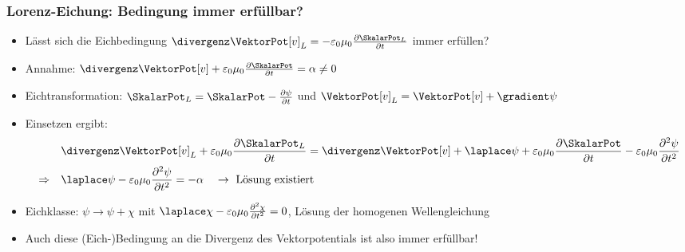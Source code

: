 \begin{frame}
  \frametitle{Lorenz-Eichung: Bedingung immer erfüllbar?}
  \begin{itemize}[<+->]
  \item Lässt sich die \alert{Eichbedingung} $\divergenz\VektorPot[v]_L = -\varepsilon_0\mu_0\frac{\partial\SkalarPot_L}{\partial t}$ immer erfüllen?
  \item Annahme: $\divergenz\VektorPot[v] + \varepsilon_0\mu_0\frac{\partial\SkalarPot}{\partial t} = \alpha \neq 0$
  \item Eichtransformation: $\SkalarPot_L = \SkalarPot - \frac{\partial \psi}{\partial t}$ und $\VektorPot[v]_L = \VektorPot[v] + \gradient\psi$
  \item Einsetzen ergibt:
    \begin{equation*}
      \begin{aligned}
        &\divergenz\VektorPot[v]_L + \varepsilon_0\mu_0\frac{\partial\SkalarPot_L}{\partial t} = \divergenz \VektorPot[v] + \laplace\psi + \varepsilon_0\mu_0\frac{\partial\SkalarPot}{\partial t} - \varepsilon_0\mu_0 \frac{\partial^2 \psi}{\partial t^2}\\
        \Rightarrow\quad & \laplace\psi - \varepsilon_0\mu_0 \frac{\partial^2 \psi}{\partial t^2} = -\alpha \quad \to \text{ Lösung existiert}
        \end{aligned}
      \end{equation*}
    \item \alert{Eichklasse}: $\psi \to \psi + \chi$ mit $\laplace\chi - \varepsilon_0\mu_0 \frac{\partial^2 \chi}{\partial t^2} = 0$, Lösung der homogenen Wellengleichung
      \item Auch diese (Eich-)Bedingung an die Divergenz des Vektorpotentials ist also immer erfüllbar! 
      \end{itemize}
\end{frame}

